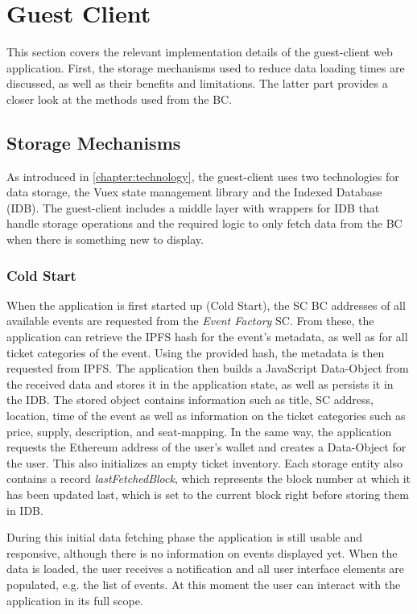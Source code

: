 \section{Guest Client}\label{section:imp:guest}

This section covers the relevant implementation details of the guest-client web application. First, the storage mechanisms used to reduce data loading times are discussed, as well as their benefits and limitations. The latter part provides a closer look at the methods used from the BC.

\subsection{Storage Mechanisms}\label{subsection:frontend-storage-mechanism}

As introduced in \ref{chapter:technology}, the guest-client uses two technologies for data storage, the Vuex state management library and the Indexed Database (IDB). The guest-client includes a middle layer with wrappers for IDB that handle storage operations and the required logic to only fetch data from the BC when there is something new to display. 

\subsubsection{Cold Start}

When the application is first started up (Cold Start), the SC BC addresses of all available events are requested from the \textit{Event Factory} SC. From these, the application can retrieve the IPFS hash for the event's metadata, as well as for all ticket categories of the event. Using the provided hash, the metadata is then requested from IPFS. The application then builds a JavaScript Data-Object from the received data and stores it in the application state, as well as persists it in the IDB. The stored object contains information such as title, SC address, location, time of the event as well as information on the ticket categories such as price, supply, description, and seat-mapping.
In the same way, the application requests the Ethereum address of the user's wallet and creates a Data-Object for the user. This also initializes an empty ticket inventory. 
Each storage entity also contains a record \textit{lastFetchedBlock}, which represents the block number at which it has been updated last, which is set to the current block right before storing them in IDB.

During this initial data fetching phase the application is still usable and responsive, although there is no information on events displayed yet. When the data is loaded, the user receives a notification and all user interface elements are populated, e.g. the list of events.
At this moment the user can interact with the application in its full scope. 

